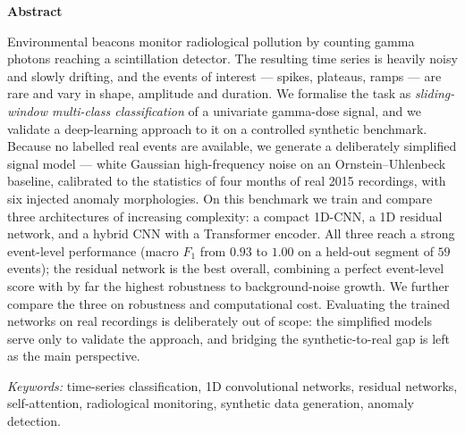 \vspace*{2cm}
\begin{center}
\textbf{\large Abstract}
\end{center}

\noindent
Environmental beacons monitor radiological pollution by counting gamma photons
reaching a scintillation detector. The resulting time series is heavily noisy
and slowly drifting, and the events of interest --- spikes, plateaus, ramps ---
are rare and vary in shape, amplitude and duration. We formalise the task as
\emph{sliding-window multi-class classification} of a univariate gamma-dose
signal, and we validate a deep-learning approach to it on a controlled
synthetic benchmark. Because no labelled real events are available, we generate
a deliberately simplified signal model --- white Gaussian high-frequency noise
on an Ornstein--Uhlenbeck baseline, calibrated to the statistics of four months
of real 2015 recordings, with six injected anomaly morphologies. On this
benchmark we train and compare three architectures of increasing complexity: a
compact 1D-CNN, a 1D residual network, and a hybrid CNN with a Transformer
encoder. All three reach a strong event-level performance (macro $F_1$ from
$0.93$ to $1.00$ on a held-out segment of $59$ events); the residual network is
the best overall, combining a perfect event-level score with by far the highest
robustness to background-noise growth. We further compare the three on
robustness and computational cost. Evaluating the trained networks on real
recordings is deliberately out of scope: the simplified models serve only to
validate the approach, and bridging the synthetic-to-real gap is left as the
main perspective.

\vfill
\begin{center}
\small
\textit{Keywords:} time-series classification, 1D convolutional networks,
residual networks, self-attention, radiological monitoring, synthetic data
generation, anomaly detection.
\end{center}
